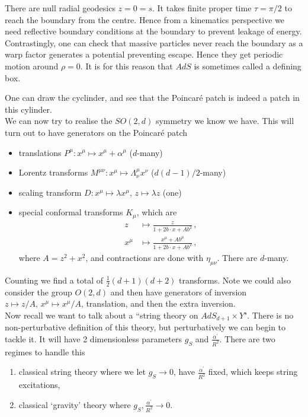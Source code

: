 \documentclass{article}
\begin{document}
\begin{remark}
	There are null radial geodesics $z=0=s$. It takes finite proper time $\tau=\pi/2$ to reach the boundary from the centre. Hence from a kinematics perspective we need reflective boundary conditions at the boundary to prevent leakage of energy. \\
	Contrastingly, one can check that massive particles never reach the boundary as a warp factor generates a potential preventing escape. Hence they get periodic motion around $\rho=0$. It is for this reason that $AdS$ is sometimes called a defining box. 
\end{remark}
One can draw the cyclinder, and see that the Poincar\'e patch is indeed a patch in this cylinder. \\
We can now try to realise the $SO(2,d)$ symmetry we know we have. This will turn out to have generators on the Poincar\'e patch
\begin{itemize}
	\item translations $P^\mu : x^\mu \mapsto x^\mu +\alpha^\mu$ ($d$-many)
	\item Lorentz transforms $M^{\mu\nu} : x^\mu \mapsto \Lambda^\mu_\nu x^\nu$ ($d(d-1)/2$-many)
	\item scaling transform $D:x^\mu \mapsto \lambda x^\mu, \, z \mapsto \lambda z$ (one)
	\item special conformal transforms $K_\mu$, which are 
	\begin{align*}
		z &\mapsto \frac{z}{1+2b \cdot x + Ab^2} \, , \\
		x^\mu &\mapsto \frac{x^\mu + Ab^\mu}{1+2b \cdot x + Ab^2} \, , 
	\end{align*}
where $A = z^2+x^2$, and contractions are done with $\eta_{\mu\nu}$. There are $d$-many. 
\end{itemize}
Counting we find a total of $\frac{1}{2}(d+1)(d+2)$ transforms. Note we could also consider the group $O(2, d)$ and then have generators of inversion $z \mapsto z/A, \, x^\mu \mapsto x^\mu / A$, translation, and then the extra inversion. \\
Now recall we want to talk about a ``string theory on $AdS_{d+1} \times Y$". There is no non-perturbative definition of this theory, but perturbatively we can begin to tackle it. It will have 2 dimensionless parameters $g_S$ and $ \frac{\alpha^\prime}{R^2}$. There are two regimes to handle this 
\begin{enumerate}
	\item classical string theory where we let $g_S \to 0$, have $\frac{\alpha^\prime}{R^2}$ fixed, which keeps string excitations,
	\item classical `gravity' theory where $g_S, \frac{\alpha^\prime}{R^2} \to 0$.
\end{enumerate}
\end{document}
